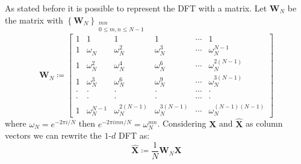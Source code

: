 \begin{Rem}
    As stated before it is possible to represent the \ac{DFT} with a matrix\cite{Frazier1999}\cite{Bredies2018}\cite{Damelin2011}. 
    Let $\boldsymbol{W}_N$ be the matrix with $\left\{\boldsymbol{W}_N\right\}_{\substack{mn \\ 0 \leq m,n \leq N-1}}$ 
    \begin{equation*}
        \boldsymbol{W}_N \coloneqq 
        \begin{bmatrix}
            1     & 1                & 1                   & 1                   & \cdots & 1                      \\
            1     & \omega_{N}^{}    & \omega_{N}^{2}      & \omega_{N}^{3}      & \cdots & \omega_{N}^{N-1}       \\
            1     & \omega_{N}^{2}   & \omega_{N}^{4}      & \omega_{N}^{6}      & \cdots & \omega_{N}^{2(N-1)}    \\
            1     & \omega_{N}^{3}   & \omega_{N}^{6}      & \omega_{N}^{9}      & \cdots & \omega_{N}^{3(N-1)}    \\
            \cdot & \cdot            & \cdot               & \cdot               & \cdots & \cdot                  \\ 
            \cdot & \cdot            & \cdot               & \cdot               & \cdots & \cdot                  \\ 
            1     & \omega_{N}^{N-1} & \omega_{N}^{2(N-1)} & \omega_{N}^{3(N-1)} & \cdots & \omega_{N}^{(N-1)(N-1)}
            \end{bmatrix}
    \end{equation*}
    where $\omega_N = e^{-2\pi i/N}$ then $e^{-2\pi imn/N} = \omega_N^{mn}$. Considering $\boldsymbol{X}$ 
    and $\hat {\boldsymbol{X}}$ as column vectors we can rewrite the $1$-$d$ \ac{DFT} as:
    \begin{equation*}
        \hat {\boldsymbol{X}} \coloneqq \frac{1}{N}\boldsymbol{W}_N\boldsymbol{X}
    \end{equation*}
\end{Rem}









